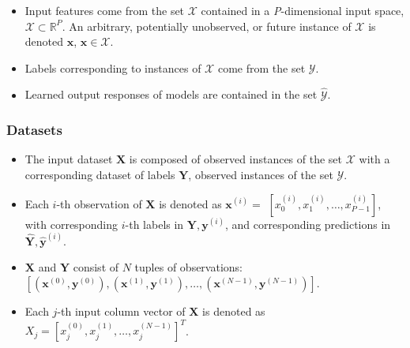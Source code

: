 \documentclass[information,article,submit,moreauthors,pdftex]{definitions/mdpi}
\begin{document}
\begin{itemize}[leftmargin=*,labelsep=5.8mm]
	\item Input features come from the set $\mathcal{X}$ contained in a \textit{P}-dimensional input space, $\mathcal{X} \subset \mathbb{R}^P$.  An arbitrary, potentially unobserved, or future instance of $\mathcal{X}$ is denoted $\mathbf{x}$, $\mathbf{x} \in \mathcal{X}$.
	\item Labels corresponding to instances of $\mathcal{X}$ come from the set $\mathcal{Y}$.
	\item Learned output responses of models are contained in the set $\mathcal{\hat{Y}}$. %
\end{itemize}	

\subsubsection{Datasets} 

\begin{itemize}[leftmargin=*,labelsep=5.8mm]
	\item The input dataset $\mathbf{X}$ is composed of observed instances of the set $\mathcal{X}$ with a corresponding dataset of labels $\mathbf{Y}$, observed instances of the set $\mathcal{Y}$. 
	\item Each $i$-th observation of $\mathbf{X}$ is denoted as $\mathbf{x}^{(i)} = $  
	$[x_0^{(i)}, x_1^{(i)}, \dots, x_{\textit{P}-1}^{(i)}]$, with corresponding $i$-th labels in $\mathbf{Y}, \mathbf{y}^{(i)}$, and corresponding predictions in $\mathbf{\hat{Y}}, \mathbf{\hat{y}}^{(i)}$. %
	\item $\mathbf{X}$ and $\mathbf{Y}$ consist of $N$ tuples of observations: $[(\mathbf{x}^{(0)},\mathbf{y}^{(0)}), (\mathbf{x}^{(1)},\mathbf{y}^{(1)}), \dots,(\mathbf{x}^{(N-1)},\mathbf{y}^{(N-1)})]$. %
	\item Each $j$-th input column vector of $\mathbf{X}$ is denoted as $X_j = [x_{j}^{(0)}, x_{j}^{(1)}, \dots, x_{j}^{(N-1)}]^T$.
\end{itemize}	 
\end{document}
